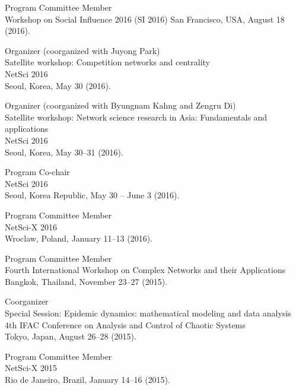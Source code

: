 \documentclass[11pt,letter]{article}
\renewenvironment{itemize}{
  \begin{list}{}{
    \setlength{\leftmargin}{1.5em}
    \setlength{\itemsep}{0.25em}
    \setlength{\parskip}{0pt}
    \setlength{\parsep}{0.25em}
  }
}{
  \end{list}
}
\begin{document}
\begin{itemize}
\item Program Committee Member\\
Workshop on Social Influence 2016 (SI 2016)
San Francisco, USA, August 18 (2016).

\item Organizer (coorganized with Juyong Park)\\
Satellite workshop: Competition networks and centrality\\
NetSci 2016\\
Seoul, Korea, May 30 (2016).

\item Organizer (coorganized with Byungnam Kahng and Zengru Di)\\
Satellite workshop: Network science research in Asia: Fundamentals and applications\\
NetSci 2016\\
Seoul, Korea, May 30--31 (2016).

\item Program Co-chair\\
NetSci 2016\\
Seoul, Korea Republic, May 30 -- June 3 (2016).

\item Program Committee Member\\
NetSci-X 2016\\
Wroclaw, Poland, January 11--13 (2016).

\item Program Committee Member\\
Fourth International Workshop on Complex Networks and their Applications\\
Bangkok, Thailand, November 23--27 (2015).

\item Coorganizer\\
Special Session: Epidemic dynamics: mathematical modeling and data analysis\\
4th IFAC Conference on Analysis and Control of Chaotic Systems\\
Tokyo, Japan, August 26--28 (2015).


\item Program Committee Member\\
NetSci-X 2015\\
Rio de Janeiro, Brazil, January 14--16 (2015).


\end{itemize}
\end{document}
